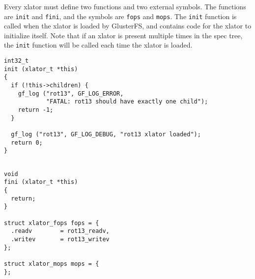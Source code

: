 \documentclass{book}[12pt]
\begin{document}
Every xlator must define two functions and two external symbols. The functions are 
\texttt{init} and \texttt{fini}, and the symbols are \texttt{fops} and \texttt{mops}.
The \texttt{init} function is called when the xlator is loaded by GlusterFS, and 
contains code for the xlator to initialize itself. Note that if an xlator is present
multiple times in the spec tree, the \texttt{init} function will be called each time
the xlator is loaded.

\begin{verbatim}
int32_t
init (xlator_t *this)
{
  if (!this->children) {
    gf_log ("rot13", GF_LOG_ERROR, 
            "FATAL: rot13 should have exactly one child");
    return -1;
  }

  gf_log ("rot13", GF_LOG_DEBUG, "rot13 xlator loaded");
  return 0;
}
\end{verbatim}

\begin{verbatim}

void 
fini (xlator_t *this)
{
  return;
}

struct xlator_fops fops = {
  .readv        = rot13_readv,
  .writev       = rot13_writev
};

struct xlator_mops mops = {
};

\end{verbatim}
\end{document}
